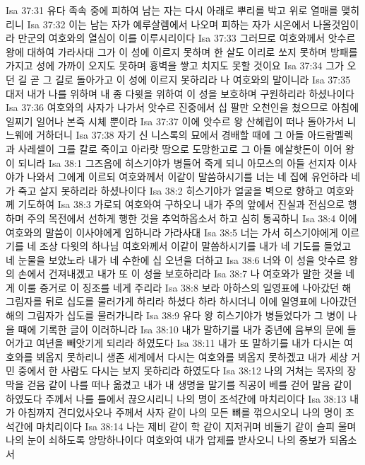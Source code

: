 Isa 37:31  유다 족속 중에 피하여 남는 자는 다시 아래로 뿌리를 박고 위로 열매를 맺히리니
Isa 37:32  이는 남는 자가 예루살렘에서 나오며 피하는 자가 시온에서 나올것임이라 만군의 여호와의 열심이 이를 이루시리이다
Isa 37:33  그러므로 여호와께서 앗수르 왕에 대하여 가라사대 그가 이 성에 이르지 못하며 한 살도 이리로 쏘지 못하며 방패를 가지고 성에 가까이 오지도 못하며 흉벽을 쌓고 치지도 못할 것이요
Isa 37:34  그가 오던 길 곧 그 길로 돌아가고 이 성에 이르지 못하리라 나 여호와의 말이니라
Isa 37:35  대저 내가 나를 위하며 내 종 다윗을 위하여 이 성을 보호하며 구원하리라 하셨나이다
Isa 37:36  여호와의 사자가 나가서 앗수르 진중에서 십 팔만 오천인을 쳤으므로 아침에 일찌기 일어나 본즉 시체 뿐이라
Isa 37:37  이에 앗수르 왕 산헤립이 떠나 돌아가서 니느웨에 거하더니
Isa 37:38  자기 신 니스록의 묘에서 경배할 때에 그 아들 아드람멜렉과 사레셀이 그를 칼로 죽이고 아라랏 땅으로 도망한고로 그 아들 에살핫돈이 이어 왕이 되니라
Isa 38:1  그즈음에 히스기야가 병들어 죽게 되니 아모스의 아들 선지자 이사야가 나와서 그에게 이르되 여호와께서 이같이 말씀하시기를 너는 네 집에 유언하라 네가 죽고 살지 못하리라 하셨나이다
Isa 38:2  히스기야가 얼굴을 벽으로 향하고 여호와께 기도하여
Isa 38:3  가로되 여호와여 구하오니 내가 주의 앞에서 진실과 전심으로 행하며 주의 목전에서 선하게 행한 것을 추억하옵소서 하고 심히 통곡하니
Isa 38:4  이에 여호와의 말씀이 이사야에게 임하니라 가라사대
Isa 38:5  너는 가서 히스기야에게 이르기를 네 조상 다윗의 하나님 여호와께서 이같이 말씀하시기를 내가 네 기도를 들었고 네 눈물을 보았노라 내가 네 수한에 십 오년을 더하고
Isa 38:6  너와 이 성을 앗수르 왕의 손에서 건져내겠고 내가 또 이 성을 보호하리라
Isa 38:7  나 여호와가 말한 것을 네게 이룰 증거로 이 징조를 네게 주리라
Isa 38:8  보라 아하스의 일영표에 나아갔던 해 그림자를 뒤로 십도를 물러가게 하리라 하셨다 하라 하시더니 이에 일영표에 나아갔던 해의 그림자가 십도를 물러가니라
Isa 38:9  유다 왕 히스기야가 병들었다가 그 병이 나을 때에 기록한 글이 이러하니라
Isa 38:10  내가 말하기를 내가 중년에 음부의 문에 들어가고 여년을 빼앗기게 되리라 하였도다
Isa 38:11  내가 또 말하기를 내가 다시는 여호와를 뵈옵지 못하리니 생존 세계에서 다시는 여호와를 뵈옵지 못하겠고 내가 세상 거민 중에서 한 사람도 다시는 보지 못하리라 하였도다
Isa 38:12  나의 거처는 목자의 장막을 걷음 같이 나를 떠나 옮겼고 내가 내 생명을 말기를 직공이 베를 걷어 말음 같이 하였도다 주께서 나를 틀에서 끊으시리니 나의 명이 조석간에 마치리이다
Isa 38:13  내가 아침까지 견디었사오나 주께서 사자 같이 나의 모든 뼈를 꺾으시오니 나의 명이 조석간에 마치리이다
Isa 38:14  나는 제비 같이 학 같이 지저귀며 비둘기 같이 슬피 울며 나의 눈이 쇠하도록 앙망하나이다 여호와여 내가 압제를 받사오니 나의 중보가 되옵소서
